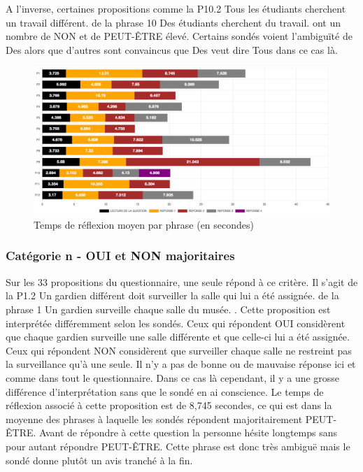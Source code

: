 \documentclass[11pt,letterpaper]{article}
\begin{document}
A l'inverse, certaines propositions comme la P10.2 \og Tous les étudiants cherchent un travail différent. \fg{} de la phrase 10 \og Des étudiants cherchent du travail. \fg{} ont un nombre de NON et de PEUT-ÊTRE élevé. Certains sondés voient l'ambiguïté de \og Des \fg{} alors que d'autres sont convaincus que \og Des \fg{} veut dire \og Tous \fg{} dans ce cas là.

\vspace{7px}

\begin{figure}[htbp]
\begin{center}
\includegraphics[width=\textwidth]{figures/temps-phrase.png}
\caption{Temps de réflexion moyen par phrase (en secondes)}
\label{fig:temps-phrase}
\end{center}
\end{figure}

\vspace{-20px}

\subsubsection{Catégorie n - \og OUI \fg{} et \og NON \fg{} majoritaires}

Sur les 33 propositions du questionnaire, une seule répond à ce critère. Il s'agit de la P1.2 \og Un gardien différent doit surveiller la salle qui lui a été assignée. \fg{} de la phrase 1 \og Un gardien surveille chaque salle du musée. \fg{}. Cette proposition est interprétée différemment selon les sondés. Ceux qui répondent OUI considèrent que chaque gardien surveille une salle différente et que celle-ci lui a été assignée. Ceux qui répondent NON considèrent que surveiller \og chaque salle \fg{} ne restreint pas la surveillance qu'à une seule. Il n'y a pas de bonne ou de mauvaise réponse  ici et comme dans tout le questionnaire. Dans ce cas là cependant, il y a une grosse différence d'interprétation sans que le sondé en ai conscience. Le temps de réflexion associé à cette proposition est de 8,745 secondes, ce qui est dans la moyenne des phrases à laquelle les sondés répondent majoritairement PEUT-ÊTRE. Avant de répondre à cette question la personne hésite longtemps sans pour autant répondre PEUT-ÊTRE. Cette phrase est donc très ambiguë mais le sondé donne plutôt un avis tranché à la fin.
\end{document}
